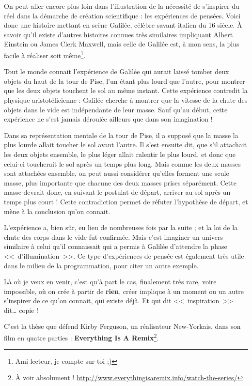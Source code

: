 On peut aller encore plus loin dans l'illustration de la nécessité de s'inspirer du réel dans la démarche de création scientifique : les expériences de pensées.
Voici donc une histoire mettant en scène Galilée, célèbre savant italien du 16\ieme{} siècle.
À savoir qu'il existe d'autres histoires connues très similaires impliquant Albert Einstein ou James Clerk Maxwell, mais celle de Galilée est, à mon sens, la plus facile à réaliser soit même\footnote{Ami lecteur, je compte sur toi ;)}.

Tout le monde connait l'expérience de Galilée qui aurait laissé tomber deux objets du haut de la tour de Pise, l'un étant plus lourd que l'autre, pour montrer que les deux objets touchent le sol au même instant.
Cette expérience contredit la physique aristotélicienne : Galilée cherche à montrer que la vitesse de la chute des objets dans le vide est indépendante de leur masse.
Sauf qu'au début, cette expérience ne s'est jamais déroulée ailleurs que dans son imagination !

Dans sa représentation mentale de la tour de Pise, il a supposé que la masse la plus lourde allait toucher le sol avant l'autre.
Il s'est ensuite dit, que s'il attachait les deux objets ensemble, le plus léger allait ralentir le plus lourd, et donc que celui-ci toucherait le sol après un temps plus long.
Mais comme les deux masses sont attachées ensemble, on peut aussi considérer qu'elles forment une seule masse, plus importante que chacune des deux masses prises séparément.
Cette masse devrait donc, en suivant le postulat de départ, arriver au sol après un temps plus court !
Cette contradiction permet de réfuter l'hypothèse de départ, et mène à la conclusion qu'on connait.

L'expérience a, bien sûr, eu lieu de nombreuses fois par la suite ; et la loi de la chute des corps dans le vide fut confirmée.
Mais c'est imaginer un univers similaire à celui qu'il connaissait qui a permis à Galilée d'attendre la phase <<~d'illumination~>>.
Ce type d'expériences de pensée est également très utile dans le milieu de la programmation, pour citer un autre exemple.

Là où je veux en venir, c'est qu'à part le cas, finalement très rare, voire impossible, où on crée à partir de \textbf{rien}, créer implique à un moment ou un autre s'inspirer de ce qu'on connait, qui existe déjà.
Et qui dit <<~inspiration~>> dit\dots{} copie !

C'est la thèse que défend Kirby Ferguson, un réalisateur New-Yorkais, dans son film en quatre parties : \textbf{Everything Is A Remix}\footnote{À voir absolument ! \url{http://www.everythingisaremix.info/watch-the-series/}}.

